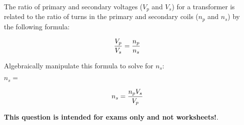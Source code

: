 

The ratio of primary and secondary voltages ($V_p$ and $V_s$) for a transformer is related to the ratio of turns in the primary and secondary coils ($n_p$ and $n_s$) by the following formula:

$${V_p \over V_s} = {n_p \over n_s}$$

Algebraically manipulate this formula to solve for $n_s$:

\vskip 20pt

$n_s = $







$$n_s = {{n_p V_s} \over V_p}$$







{\bf This question is intended for exams only and not worksheets!}.



